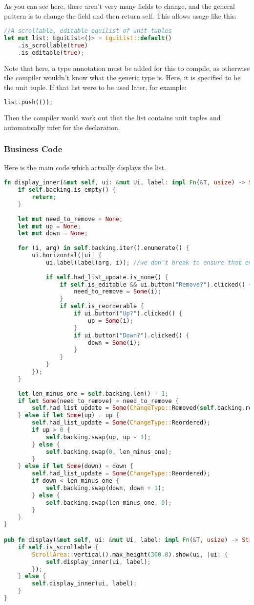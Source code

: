 \documentclass{article}
\begin{document}
As you can see here, there aren't very many fields to change, and the general pattern is to change the field and then return self. This allows usage like this:

\begin{lstlisting}[language=Rust]
//A scrollable, editable eguilist of unit tuples
let mut list: EguiList<()> = EguiList::default()
	.is_scrollable(true)
	.is_editable(true);
\end{lstlisting}

Note that here, a type annotation must be added for this to compile, as otherwise the compiler wouldn't know what the generic type is. Here, it is specified to be the unit tuple. If that list were to be used later, for example:
\begin{lstlisting}[language=Rust]
list.push(());
\end{lstlisting}
Then the compiler would work out that the list contains unit tuples and automatically infer for the declaration.

\subsubsection{Business Code}
Here is the main code which actually displays the list.

\begin{lstlisting}[language=Rust]
fn display_inner(&mut self, ui: &mut Ui, label: impl Fn(&T, usize) -> String) {
	if self.backing.is_empty() {
		return;
	}
	
	let mut need_to_remove = None; 
	let mut up = None; 
	let mut down = None;
	
	for (i, arg) in self.backing.iter().enumerate() {
		ui.horizontal(|ui| {
			ui.label(label(arg, i)); //we don't break to ensure that everything always gets drawn, but we still skip over lots of logic if we have a change
			
			if self.had_list_update.is_none() {
				if self.is_editable && ui.button("Remove?").clicked() {
					need_to_remove = Some(i);
				}
				if self.is_reorderable {
					if ui.button("Up?").clicked() {
						up = Some(i);
					}
					if ui.button("Down?").clicked() {
						down = Some(i);
					}
				}
			}
		});
	}
	
	let len_minus_one = self.backing.len() - 1;
	if let Some(need_to_remove) = need_to_remove {
		self.had_list_update = Some(ChangeType::Removed(self.backing.remove(need_to_remove)));
	} else if let Some(up) = up {
		self.had_list_update = Some(ChangeType::Reordered);
		if up > 0 {
			self.backing.swap(up, up - 1);
		} else {
			self.backing.swap(0, len_minus_one);
		}
	} else if let Some(down) = down {
		self.had_list_update = Some(ChangeType::Reordered);
		if down < len_minus_one {
			self.backing.swap(down, down + 1);
		} else {
			self.backing.swap(len_minus_one, 0);
		}
	}
}

pub fn display(&mut self, ui: &mut Ui, label: impl Fn(&T, usize) -> String) {	
	if self.is_scrollable {
		ScrollArea::vertical().max_height(300.0).show(ui, |ui| {
			self.display_inner(ui, label);
		});
	} else {
		self.display_inner(ui, label);
	}
}
\end{lstlisting}
\end{document}
